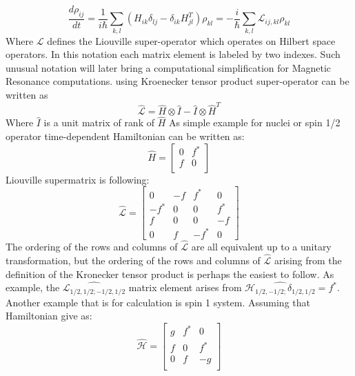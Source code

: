  \begin{equation}\label{eq:16}
\frac{d\rho_{ij}}{dt}=\frac{1}{i\hbar}\sum_{k,l}(H_{ik}\delta_{lj}-\delta_{ik}H_{jl}^T)\rho_{kl}=-\frac{i}{\hbar}\sum_{k,l}\mathcal{L}_{ij,kl}\rho_{kl}
\end{equation} 
Where $\mathcal{L}$ defines the Liouville super-operator which operates on Hilbert space operators. In this notation each matrix element is labeled by two indexes. Such unusual notation will later bring a computational simplification for Magnetic Resonance computations. 
using Kroenecker tensor product super-operator can be written as 
\begin{equation}\label{eq:17}
\hat{\mathcal{L}}=\hat{H}\otimes\hat{I}-\hat{I}\otimes\hat{H}^{T}
\end{equation} 
Where $\hat{I}$ is a unit matrix of rank of $\hat{H}$
As simple example for nuclei or spin 1/2 operator time-dependent Hamiltonian can be written as: 
\begin{equation}\label{eq:18}
\hat{H} = \begin{bmatrix}
       0 & f^*           \\[0.3em]
       f & 0 \\[0.3em]
     \end{bmatrix}
\end{equation}
Liouville supermatrix is following: 
\begin{equation}\label{eq:19}
\hat{\mathcal{L}} = \begin{bmatrix}
       0 & -f & f^* & 0          \\[0.3em]
       -f^* & 0 & 0 & f^* \\[0.3em]
       f & 0 & 0 & -f \\[0.3em]
       0 & f & -f^* & 0 
     \end{bmatrix}
\end{equation}
The ordering of the rows and columns of $\hat{\mathcal{L}}$ are all equivalent up to a unitary transformation, but the ordering of the rows and columns of $\hat{\mathcal{L}}$ arising from the definition of the Kronecker tensor product is perhaps the easiest to follow. As example, the $\hat{\mathcal{L}_{1/2,1/2;-1/2,1/2}}$ matrix element arises from $\hat{\mathcal{H}_{1/2,-1/2;}\delta_{1/2,1/2}}=f^*$. Another example that is  for calculation is spin 1 system. Assuming that Hamiltonian give as: 
\begin{equation}\label{eq:hamliv}
\hat{\mathcal{H}} = \begin{bmatrix}
       g & f^* & 0 \\[0.3em]
       f & 0 & f^* \\[0.3em]
       0 & f & -g \\[0.3em]
     \end{bmatrix}
\end{equation}
